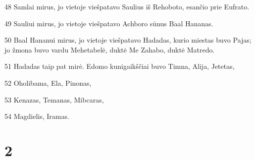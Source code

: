 \par 48 Samlai mirus, jo vietoje viešpatavo Saulius iš Rehoboto, esančio prie Eufrato. 
\par 49 Sauliui mirus, jo vietoje viešpatavo Achboro sūnus Baal Hananas. 
\par 50 Baal Hananui mirus, jo vietoje viešpatavo Hadadas, kurio miestas buvo Pajas; jo žmona buvo vardu Mehetabelė, duktė Me Zahabo, duktė Matredo. 
\par 51 Hadadas taip pat mirė. Edomo kunigaikščiai buvo Timna, Alija, Jetetas, 
\par 52 Oholibama, Ela, Pinonas, 
\par 53 Kenazas, Temanas, Mibcaras, 
\par 54 Magdielis, Iramas.


\chapter{2}

